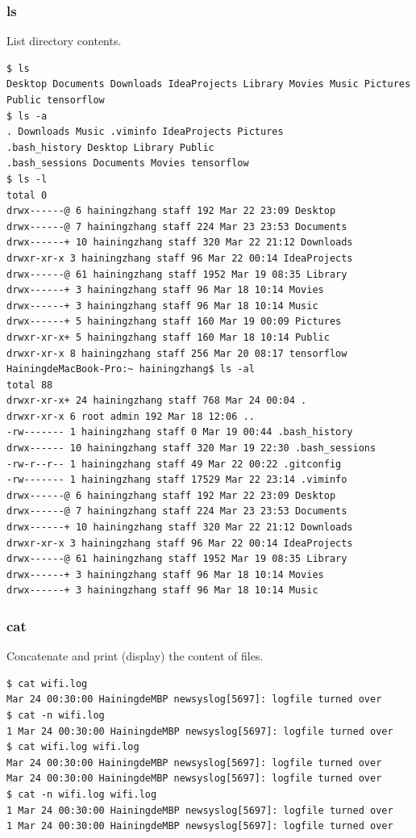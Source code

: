 \subsubsection{ls}
List directory contents.
\begin{verbatim}
$ ls
Desktop Documents Downloads IdeaProjects Library Movies Music Pictures Public tensorflow
$ ls -a
. Downloads Music .viminfo IdeaProjects Pictures
.bash_history Desktop Library Public
.bash_sessions Documents Movies tensorflow
$ ls -l
total 0
drwx------@ 6 hainingzhang staff 192 Mar 22 23:09 Desktop
drwx------@ 7 hainingzhang staff 224 Mar 23 23:53 Documents
drwx------+ 10 hainingzhang staff 320 Mar 22 21:12 Downloads
drwxr-xr-x 3 hainingzhang staff 96 Mar 22 00:14 IdeaProjects
drwx------@ 61 hainingzhang staff 1952 Mar 19 08:35 Library
drwx------+ 3 hainingzhang staff 96 Mar 18 10:14 Movies
drwx------+ 3 hainingzhang staff 96 Mar 18 10:14 Music
drwx------+ 5 hainingzhang staff 160 Mar 19 00:09 Pictures
drwxr-xr-x+ 5 hainingzhang staff 160 Mar 18 10:14 Public
drwxr-xr-x 8 hainingzhang staff 256 Mar 20 08:17 tensorflow
HainingdeMacBook-Pro:~ hainingzhang$ ls -al
total 88
drwxr-xr-x+ 24 hainingzhang staff 768 Mar 24 00:04 .
drwxr-xr-x 6 root admin 192 Mar 18 12:06 ..
-rw------- 1 hainingzhang staff 0 Mar 19 00:44 .bash_history
drwx------ 10 hainingzhang staff 320 Mar 19 22:30 .bash_sessions
-rw-r--r-- 1 hainingzhang staff 49 Mar 22 00:22 .gitconfig
-rw------- 1 hainingzhang staff 17529 Mar 22 23:14 .viminfo
drwx------@ 6 hainingzhang staff 192 Mar 22 23:09 Desktop
drwx------@ 7 hainingzhang staff 224 Mar 23 23:53 Documents
drwx------+ 10 hainingzhang staff 320 Mar 22 21:12 Downloads
drwxr-xr-x 3 hainingzhang staff 96 Mar 22 00:14 IdeaProjects
drwx------@ 61 hainingzhang staff 1952 Mar 19 08:35 Library
drwx------+ 3 hainingzhang staff 96 Mar 18 10:14 Movies
drwx------+ 3 hainingzhang staff 96 Mar 18 10:14 Music
\end{verbatim}

\subsubsection{cat}
Concatenate and print (display) the content of files.
\begin{verbatim}
$ cat wifi.log
Mar 24 00:30:00 HainingdeMBP newsyslog[5697]: logfile turned over
$ cat -n wifi.log
1 Mar 24 00:30:00 HainingdeMBP newsyslog[5697]: logfile turned over
$ cat wifi.log wifi.log
Mar 24 00:30:00 HainingdeMBP newsyslog[5697]: logfile turned over
Mar 24 00:30:00 HainingdeMBP newsyslog[5697]: logfile turned over
$ cat -n wifi.log wifi.log
1 Mar 24 00:30:00 HainingdeMBP newsyslog[5697]: logfile turned over
1 Mar 24 00:30:00 HainingdeMBP newsyslog[5697]: logfile turned over
\end{verbatim}


